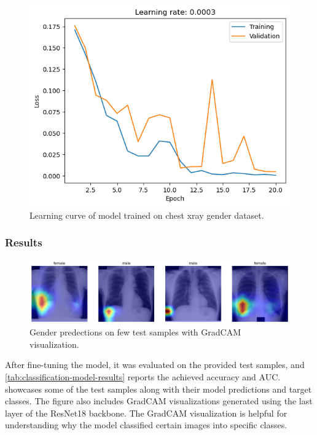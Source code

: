     \begin{figure}[htbp]
        \centering
        \includegraphics[width=\linewidth]{../plots/gender/learning.png}
        \caption{Learning curve of model trained on chest xray gender dataset.}
        \label{fig:gender-learning-curve}
    \end{figure}

\subsubsection{Results}

    \begin{figure}[!htbp]
        \centering
        \includegraphics[width=\linewidth]{../plots/gender/result.png}
        \caption{Gender predections on few test samples with GradCAM visualization.}
        \label{fig:gender-results}
    \end{figure} 

    After fine-tuning the model, it was evaluated on the provided test samples, and \cref{tab:classification-model-results} reports the achieved accuracy and AUC.  showcases some of the test samples along with their model predictions and target classes. The figure also includes GradCAM visualizations generated using the last layer of the ResNet18 backbone. The GradCAM visualization is helpful for understanding why the model classified certain images into specific classes.
